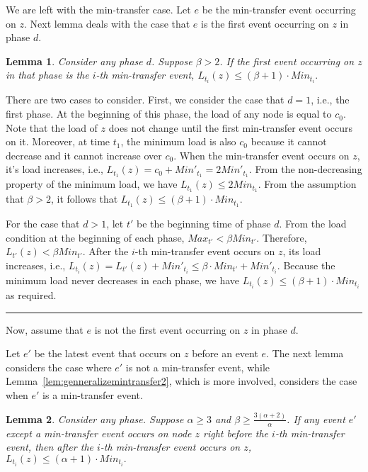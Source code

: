 \documentclass[a4paper]{article}
\newtheorem{lemma}{Lemma}
\newenvironment{proof}{{\bf Proof:}}{\hfill\rule{1.5mm}{3mm}\vspace{0.1in}}
\begin{document}
We are left with the min-transfer case. Let $e$ be the min-transfer
event occurring on $z$. Next lemma deals with the case that $e$ is the
first event occurring on $z$ in phase $d$.

\begin{lemma}
  \label{lem:minimum-decrease}
  Consider any phase $d$. Suppose $\beta>2$. If the first event
  occurring on $z$ in that phase is the $i$-th min-transfer event, 
  $L_{t_{i}}(z)\leq (\beta+1)\cdot Min_{t_{i}}.$
\end{lemma}

\begin{proof}
  There are two cases to consider.
  First, we consider the case that $d=1$, i.e., the first phase.
  At the beginning of this phase, the load of any node is equal to $c_0$. 
  Note that the load of $z$ does not change until the first min-transfer event occurs on it.
  Moreover, at time $t_1$, the minimum load is
  also $c_0$ because it cannot decrease and it cannot increase over $c_0$. 
  When the min-transfer event occurs on $z$, it's load increases, i.e.,
  $L_{t_{1}}(z)=c_0+ Min'_{t_1}= 2Min'_{t_{1}}$. From the
  non-decreasing property of the minimum load, we have 
  $L_{t_{1}}(z)\leq 2Min_{t_{1}}$. From the assumption that $\beta>2$, it follows that
  $L_{t_{1}}(z)\leq (\beta+1)\cdot Min_{t_{1}}$.
	  
  For the case that $d > 1$, let $t'$ be the beginning time of phase
  $d$. From the load condition at the beginning of each phase,
   $Max_{t'}<\beta Min_{t'}$. Therefore, $L_{t'}(z)<\beta Min_{t'}$. 
   After the $i$-th min-transfer event occurs on $z$, its load increases,
  i.e., $L_{t_{i}}(z)=L_{t'}(z)+Min'_{t_{i}} \leq \beta\cdot Min_{t'}
  +Min'_{t_{i}}$.  Because the minimum load never decreases in each phase,
  we have  $L_{t_{i}}(z)\leq (\beta+1)\cdot Min_{t_{i}}$ as
  required.
\end{proof}

Now, assume that $e$ is not the first event occurring on
$z$ in phase $d$.

Let $e'$ be the latest event that occurs on $z$ before an event $e$. The
next lemma considers the case where $e'$ is not a min-transfer event,
while Lemma~\ref{lem:genneralizemintransfer2}, which is more involved, considers the case when
$e'$ is a min-transfer event.

\begin{lemma}
  \label{lem:event-before-min-transfer}
  Consider any phase. Suppose $\alpha\geq 3$ and $\beta\geq
  \frac{3(\alpha+2)}{\alpha}$. If any event $e'$ except a min-transfer event occurs on
  node $z$ right before the $i$-th min-transfer event, then after the
  $i$-th min-transfer event occurs on $z$, $ L_{t_{i}}(z)\leq(\alpha +
  1)\cdot Min_{t_{i}}.  $
\end{lemma}
\end{document}
